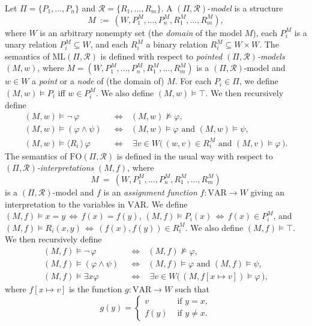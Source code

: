 \documentclass[copyright,creativecommons]{eptcs}
\begin{document}
Let $\Pi = \{P_1,...,P_n\}$ and $\mathcal{R} = \{R_1,...,R_m\}$.
A $(\Pi,\mathcal{R})$-\emph{model} 
is a structure
$$M\ :=\ (W,P_1^M,...,P_n^M, R_1^M,...,R_m^M),$$
where $W$ is an arbitrary nonempty set (the \emph{domain}
of the model $M$), 
each $P_i^M$ is a unary relation $P_i^M\subseteq W$, and
each $R_i^M$ a binary relation $R_i^M\subseteq W\times W$.
The semantics of $\mathrm{ML}(\Pi,\mathcal{R})$ is defined
with respect to \emph{pointed $(\Pi,\mathcal{R})$-models}
$(M,w)$, where $M = (W,P_1^M,...,P_n^M,R_1^M,...,R_m^M)$
is a $(\Pi,\mathcal{R})$-model and $w\in W$ a \emph{point} or a \emph{node} of (the
domain of) $M$.
For each $P_i\in\Pi$, we define $(M,w)\models P_i$ iff $w\in P_i^M$. We also define $(M,w)\models \top$.
We then recursively define
\[
\begin{array}{lll}
(M,w)\models \neg\, \varphi\ \ &\Leftrightarrow\ \ \ (M,w)\not\models\varphi,\\
(M,w)\models (\varphi\wedge\psi)\ \ &\Leftrightarrow\ \ \ (M,w)\models \varphi\text{ and }(M,w)\models\psi,\\
(M,w)\models \langle R_i\, \rangle\, \varphi\ \ &\Leftrightarrow\
\ \ \ \exists v\in W\bigl(\, (w,v)\in R_i^M\text{ and }(M,v)\models\varphi\,\bigr).
\end{array}
\]
The semantics of $\mathrm{FO}(\Pi,\mathcal{R})$ is defined
in the usual way with respect to \emph{$(\Pi,\mathcal{R})$-interpretations}
$(M,f)$, where
$$M\ =\ (W,P_1^M,...,P_n^M, R_1^M,...,R_m^M)$$
is a $(\Pi,\mathcal{R})$-model and $f$ is an \emph{assignment function}
$f:\mathrm{VAR}\rightarrow W$ giving an interpretation to the variables in $\mathrm{VAR}$.
We define $(M,f)\models x = y\, \Leftrightarrow\, f(x) = f(y)$, $(M,f)\models P_i(x)\, \Leftrightarrow\, f(x)\in P_i^M$,
and $(M,f)\models R_i(x,y)\, \Leftrightarrow\, (f(x),f(y))\in R_i^M$. We also define $(M,f)\models\top$.
We then recursively define
\[
\begin{array}{lll}
(M,f)\models \neg\, \varphi\ \ &\Leftrightarrow\ \ \ (M,f)\not\models\varphi,\\
(M,f)\models (\varphi\wedge\psi)\ \ &\Leftrightarrow\ \ \ (M,f)\models \varphi\text{ and }(M,f)\models\psi,\\
(M,f)\models \exists x\varphi\ \ &\Leftrightarrow\ \ \ \ \exists v\in W\bigl(\, (M,f[x\mapsto v])\models\varphi\,\bigr),
\end{array}
\]
where $f[x\mapsto v]$ is the function $g:\mathrm{VAR}\rightarrow W$ such that
\[
 g(y) = \begin{cases}
    v & \text{ if } y=x,\\
f(y) & \text{ if } y\not=x.
 \end{cases}
\]
\end{document}
